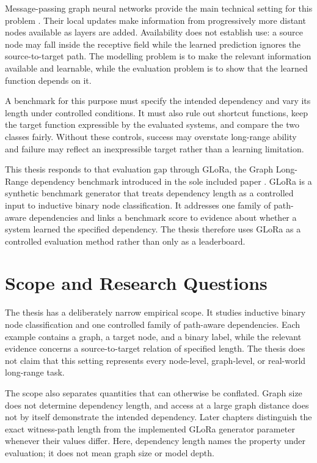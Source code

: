 Message-passing graph neural networks provide the main technical setting for this problem \cite{scarselli2008graph}.
Their local updates make information from progressively more distant nodes available as layers are added.
Availability does not establish use: a source node may fall inside the receptive field while the learned prediction ignores the source-to-target path.
The modelling problem is to make the relevant information available and learnable, while the evaluation problem is to show that the learned function depends on it.

A benchmark for this purpose must specify the intended dependency and vary its length under controlled conditions.
It must also rule out shortcut functions, keep the target function expressible by the evaluated systems, and compare the two classes fairly.
Without these controls, success may overstate long-range ability and failure may reflect an inexpressible target rather than a learning limitation.

This thesis responds to that evaluation gap through GLoRa, the Graph Long-Range dependency benchmark introduced in the sole included paper \cite{zhou2025glora}.
GLoRa is a synthetic benchmark generator that treats dependency length as a controlled input to inductive binary node classification.
It addresses one family of path-aware dependencies and links a benchmark score to evidence about whether a system learned the specified dependency.
The thesis therefore uses GLoRa as a controlled evaluation method rather than only as a leaderboard.

\section{Scope and Research Questions}

The thesis has a deliberately narrow empirical scope.
It studies inductive binary node classification and one controlled family of path-aware dependencies.
Each example contains a graph, a target node, and a binary label, while the relevant evidence concerns a source-to-target relation of specified length.
The thesis does not claim that this setting represents every node-level, graph-level, or real-world long-range task.

The scope also separates quantities that can otherwise be conflated.
Graph size does not determine dependency length, and access at a large graph distance does not by itself demonstrate the intended dependency.
Later chapters distinguish the exact witness-path length from the implemented GLoRa generator parameter whenever their values differ.
Here, dependency length names the property under evaluation; it does not mean graph size or model depth.

